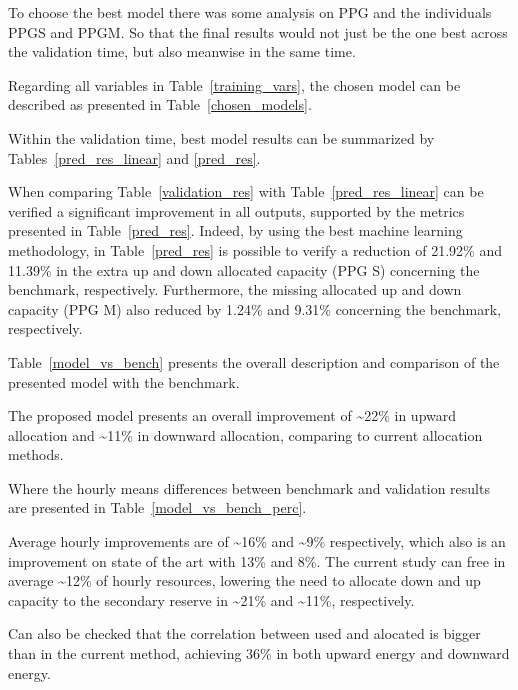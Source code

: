 To choose the best model there was some analysis on \gls{PPG} and the individuals \gls{PPGS} and \gls{PPGM}. So that the final results would not just be the one best across the validation time, but also meanwise in the same time.\par
Regarding all variables in Table~\ref{training_vars}, the chosen model can be described as presented in Table~\ref{chosen_models}.

Within the validation time, best model results can be summarized by Tables~\ref{pred_res_linear} and \ref{pred_res}.



When comparing Table~\ref{validation_res} with Table~\ref{pred_res_linear} can be verified a significant improvement in all outputs, supported by the metrics presented in Table~\ref{pred_res}.
%
Indeed, by using the best machine learning methodology, in Table~\ref{pred_res} is possible to verify a reduction of 21.92\% and 11.39\% in the extra up and down allocated capacity (PPG S) concerning the benchmark, respectively.
%
Furthermore, the missing allocated up and down capacity (PPG M) also reduced by 1.24\% and 9.31\% concerning the benchmark, respectively.

Table~\ref{model_vs_bench} presents the overall description and comparison of the presented model with the benchmark.


The proposed model presents an overall improvement of \textasciitilde22\% in upward allocation and \textasciitilde11\% in downward allocation, comparing to current allocation methods.\par
Where the hourly means differences between benchmark and validation results are presented in Table~\ref{model_vs_bench_perc}.



Average hourly improvements are of \textasciitilde16\% and \textasciitilde9\% respectively, which also is an improvement on state of the art \cite{Algarvio2024} with 13\% and 8\%.
The current study can free in average \textasciitilde12\% of hourly resources, lowering the need to allocate down and up capacity to the secondary reserve in \textasciitilde21\% and \textasciitilde11\%, respectively.\par

Can also be checked that the correlation between used and alocated is bigger than in the current method, achieving 36\% in both upward energy and downward energy. \par

